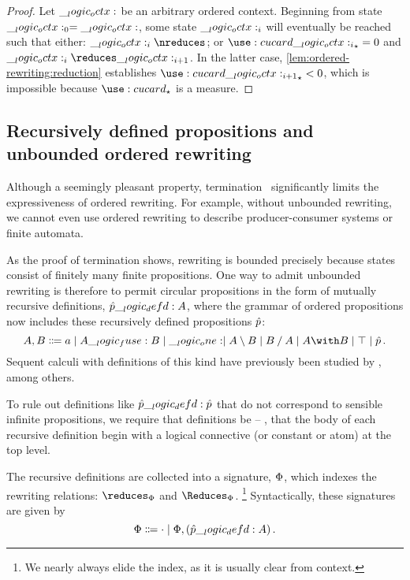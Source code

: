 %
\begin{proof}
  Let $\__logic_octx:$ be an arbitrary ordered context.
  Beginning from state $\__logic_octx:_0 = \__logic_octx:$, some state $\__logic_octx:_i$ will eventually be reached such that either: $\octx_i \nreduces$; or $\card{\octx_i}_{\star} = 0$ and $\octx_i \reduces \octx_{i+1}$.
  In the latter case, \cref{lem:ordered-rewriting:reduction} establishes $\card{\octx_{i+1}}_{\star} < 0$, which is impossible because $\card{}_{\star}$ is a measure.
\end{proof}


\subsection{Recursively defined propositions and unbounded ordered rewriting}

Although a seemingly pleasant property, termination~ significantly limits the expressiveness of ordered rewriting.
For example, without unbounded rewriting, we cannot even use ordered rewriting to describe producer-consumer systems or finite automata.

As the proof of termination shows, rewriting is bounded
precisely because
states
consist of finitely many finite propositions.
One way to admit unbounded rewriting is therefore to permit circular propositions in the form of mutually recursive definitions, $\hat{p} \__logic_defd: A$, where the grammar of ordered propositions now includes these recursively defined propositions $\hat{p}$:
\begin{equation*}
  A,B \Coloneqq a \mid A \fuse B \mid \one \mid A \limp B \mid B \pmir A \mid A \with B \mid \top \mid \defp{p}
  \,.
\end{equation*}
Sequent calculi with definitions of this kind have previously been studied by \textcites{Hallnas:??}{Erikkson:??}{Schroeder-Heister:??}{McDowell+Miller:??}{Tiu+Momigliano:??}, among others.

To rule out definitions like $\hat{p} \__logic_defd: \hat{p}$ that do not correspond to sensible infinite propositions, we require that definitions be \autocite{Gay+Hole:AI05} -- \ie, that the body of each recursive definition begin with a logical connective (or constant or atom) at the top level.

The recursive definitions are collected into a signature, $\Phi$, which indexes the rewriting relations: $\reduces_{\orsig}$ and $\Reduces_{\orsig}$.%
\footnote{We nearly always elide the index, as it is usually clear from context.} 
Syntactically, these signatures are given by
\begin{equation*}
  \Phi \Coloneqq \cdot \mid \Phi , (\hat{p} \__logic_defd: A)
  \,.
\end{equation*}


